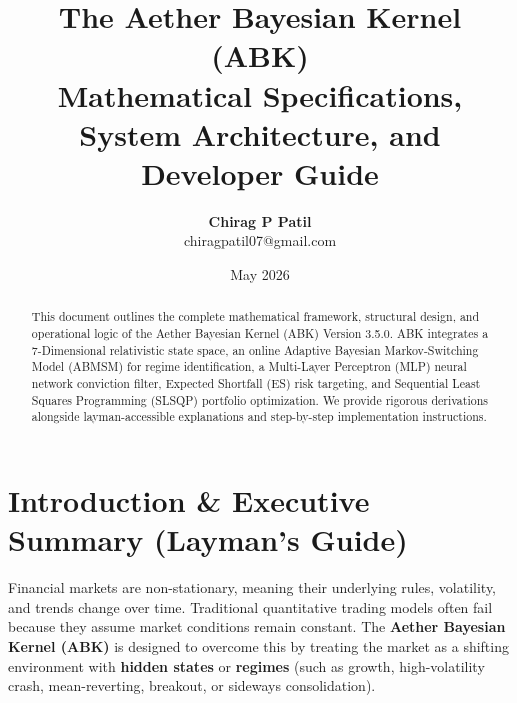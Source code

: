\documentclass[11pt,a4paper]{article}
\title{\textbf{The Aether Bayesian Kernel (ABK) \\ Mathematical Specifications, System Architecture, and Developer Guide}}
\author{\textbf{Chirag P Patil} \\ \small chiragpatil07@gmail.com}
\date{May 2026}
\begin{document}
\maketitle

\begin{abstract}
This document outlines the complete mathematical framework, structural design, and operational logic of the Aether Bayesian Kernel (ABK) Version 3.5.0. ABK integrates a 7-Dimensional relativistic state space, an online Adaptive Bayesian Markov-Switching Model (ABMSM) for regime identification, a Multi-Layer Perceptron (MLP) neural network conviction filter, Expected Shortfall (ES) risk targeting, and Sequential Least Squares Programming (SLSQP) portfolio optimization. We provide rigorous derivations alongside layman-accessible explanations and step-by-step implementation instructions.
\end{abstract}

\newpage

\tableofcontents
\newpage

\section{Introduction \& Executive Summary (Layman's Guide)}

Financial markets are non-stationary, meaning their underlying rules, volatility, and trends change over time. Traditional quantitative trading models often fail because they assume market conditions remain constant. The \textbf{Aether Bayesian Kernel (ABK)} is designed to overcome this by treating the market as a shifting environment with \textbf{hidden states} or \textbf{regimes} (such as growth, high-volatility crash, mean-reverting, breakout, or sideways consolidation).
\end{document}
